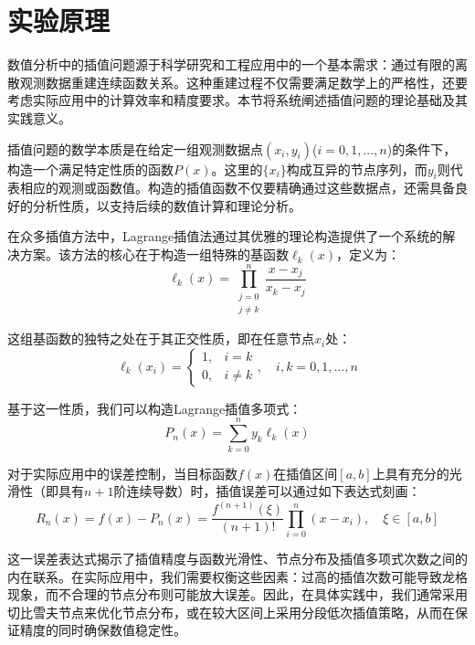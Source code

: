 \documentclass{joulabreport}
\author{Ilya}
\begin{document}
\maketitle

\song\xiaosi

\section{实验原理}
数值分析中的插值问题源于科学研究和工程应用中的一个基本需求\cite{ref1}：通过有限的离散观测数据重建连续函数关系。这种重建过程不仅需要满足数学上的严格性\cite{ref2}，还要考虑实际应用中的计算效率和精度要求。本节将系统阐述插值问题的理论基础及其实践意义\cite{ref3,ref4}。

插值问题的数学本质是在给定一组观测数据点$(x_i, y_i)$($i=0,1,\ldots,n$)的条件下，构造一个满足特定性质的函数$P(x)$。这里的$\{x_i\}$构成互异的节点序列，而$y_i$则代表相应的观测或函数值。构造的插值函数不仅要精确通过这些数据点，还需具备良好的分析性质，以支持后续的数值计算和理论分析。

在众多插值方法中，Lagrange插值法通过其优雅的理论构造提供了一个系统的解决方案。该方法的核心在于构造一组特殊的基函数$\ell_k(x)$，定义为：
\begin{equation}
\ell_k(x) = \prod_{\substack{j=0\\j\neq k}}^n \frac{x-x_j}{x_k-x_j}
\end{equation}

这组基函数的独特之处在于其正交性质，即在任意节点$x_i$处：
\begin{equation}
\ell_k(x_i) = \begin{cases}
1, & i = k \\
0, & i \neq k
\end{cases}, \quad i,k = 0,1,\ldots,n
\end{equation}

基于这一性质，我们可以构造Lagrange插值多项式：
\begin{equation}
P_n(x) = \sum_{k=0}^n y_k\ell_k(x)
\end{equation}

对于实际应用中的误差控制，当目标函数$f(x)$在插值区间$[a,b]$上具有充分的光滑性（即具有$n+1$阶连续导数）时，插值误差可以通过如下表达式刻画：
\begin{equation}
R_n(x) = f(x) - P_n(x) = \frac{f^{(n+1)}(\xi)}{(n+1)!}\prod_{i=0}^n(x-x_i), \quad \xi \in [a,b]
\end{equation}

这一误差表达式揭示了插值精度与函数光滑性、节点分布及插值多项式次数之间的内在联系。在实际应用中，我们需要权衡这些因素：过高的插值次数可能导致龙格现象，而不合理的节点分布则可能放大误差。因此，在具体实践中，我们通常采用切比雪夫节点来优化节点分布，或在较大区间上采用分段低次插值策略，从而在保证精度的同时确保数值稳定性。
\end{document}

